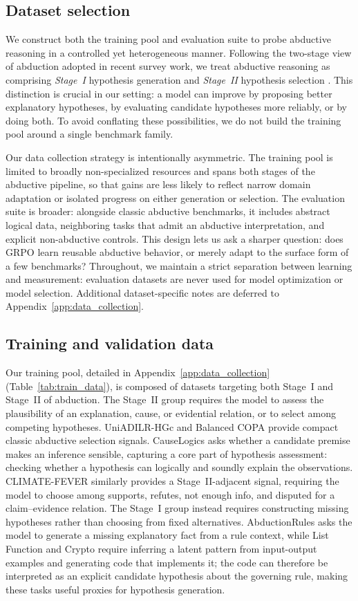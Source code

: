 \documentclass[11pt]{article}
\begin{document}
\subsection{Dataset selection}
We construct both the training pool and evaluation suite to probe abductive reasoning in a controlled yet heterogeneous manner. Following the two-stage view of abduction adopted in recent survey work, we treat abductive reasoning as comprising \emph{Stage~I} hypothesis generation and \emph{Stage~II} hypothesis selection \citep{salimi2026wiringwhyunifiedtaxonomy}. This distinction is crucial in our setting: a model can improve by proposing better explanatory hypotheses, by evaluating candidate hypotheses more reliably, or by doing both. To avoid conflating these possibilities, we do not build the training pool around a single benchmark family.

Our data collection strategy is intentionally asymmetric. The training pool is limited to broadly non-specialized resources and spans both stages of the abductive pipeline, so that gains are less likely to reflect narrow domain adaptation or isolated progress on either generation or selection. The evaluation suite is broader: alongside classic abductive benchmarks, it includes abstract logical data, neighboring tasks that admit an abductive interpretation, and explicit non-abductive controls. This design lets us ask a sharper question: does GRPO learn reusable abductive behavior, or merely adapt to the surface form of a few benchmarks? Throughout, we maintain a strict separation between learning and measurement: evaluation datasets are never used for model optimization or model selection. Additional dataset-specific notes are deferred to Appendix~\ref{app:data_collection}.

\subsection{Training and validation data}

Our training pool, detailed in Appendix~\ref{app:data_collection} (Table~\ref{tab:train_data}), is composed of datasets targeting both Stage~I and Stage~II of abduction. The Stage~II group requires the model to assess the plausibility of an explanation, cause, or evidential relation, or to select among competing hypotheses. UniADILR-HGc and Balanced COPA provide compact classic abductive selection signals. CauseLogics asks whether a candidate premise makes an inference sensible, capturing a core part of hypothesis assessment: checking whether a hypothesis can logically and soundly explain the observations. CLIMATE-FEVER similarly provides a Stage~II-adjacent signal, requiring the model to choose among supports, refutes, not enough info, and disputed for a claim--evidence relation. The Stage~I group instead requires constructing missing hypotheses rather than choosing from fixed alternatives. AbductionRules asks the model to generate a missing explanatory fact from a rule context, while List Function and Crypto require inferring a latent pattern from input-output examples and generating code that implements it; the code can therefore be interpreted as an explicit candidate hypothesis about the governing rule, making these tasks useful proxies for hypothesis generation.
\end{document}
